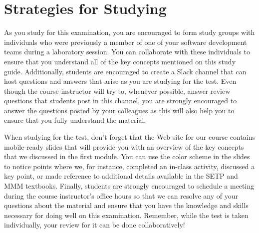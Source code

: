 
\vspace*{-.15in}
\section*{Strategies for Studying}
\vspace*{-.05in}

As you study for this examination, you are encouraged to form study groups with individuals who were previously a
member of one of your software development teams during a laboratory session. You can collaborate with these individuals
to ensure that you understand all of the key concepts mentioned on this study guide. Additionally, students are
encouraged to create a Slack channel that can host questions and answers that arise as you are studying for the test.
Even though the course instructor will try to, whenever possible, answer review questions that students post in this
channel, you are strongly encouraged to answer the questions posted by your colleagues as this will also help you to
ensure that you fully understand the material.

When studying for the test, don't forget that the Web site for our course contains mobile-ready slides that will provide
you with an overview of the key concepts that we discussed in the first module. You can use the color scheme in the
slides to notice points where we, for instance, completed an in-class activity, discussed a key point, or made reference
to additional details available in the SETP and MMM textbooks. Finally, students are strongly encouraged to schedule a
meeting during the course instructor's office hours so that we can resolve any of your questions about the material and
ensure that you have the knowledge and skills necessary for doing well on this examination. Remember, while the test is
taken individually, your review for it can be done collaboratively!


